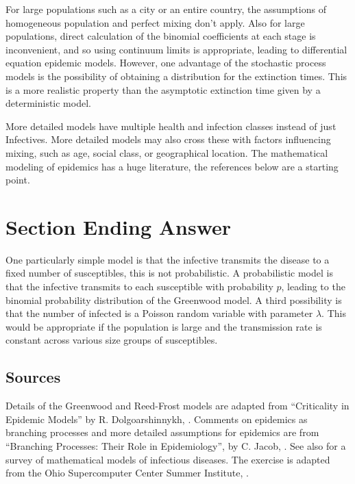 \documentclass[12pt]{article}
\begin{document}
For large populations such as a city or an entire country, the
assumptions of homogeneous population and perfect mixing don't apply.
Also for large populations, direct calculation of the binomial
coefficients at each stage is inconvenient, and so using continuum
limits is appropriate, leading to differential equation epidemic models.
However, one advantage of the stochastic process models is the
possibility of obtaining a distribution for the extinction times. This
is a more realistic property than the asymptotic extinction time given
by a deterministic model.

More detailed models have multiple health and infection classes instead
of just Infectives.  More detailed models may also cross these with
factors influencing mixing, such as age, social class, or geographical
location.  The mathematical modeling of epidemics has a huge literature,
the references below are a starting point.

\section*{Section Ending Answer}

One particularly simple model is that the infective transmits the
disease to a fixed number of susceptibles, this is not
probabilistic.  A probabilistic model is that the infective transmits
to each susceptible with probability \( p \), leading to the binomial
probability distribution of the Greenwood model.  A third possibility
is that the number of infected is a Poisson random
variable with parameter \( \lambda \).  This would be appropriate if
the population is large and the transmission rate is constant across
various size groups of susceptibles.

\subsection*{Sources}

Details of the Greenwood and Reed-Frost models are adapted from
``Criticality in Epidemic Models'' by R. Dolgoarshinnykh,
\cite{dolgoarshinnykh}. Comments on epidemics as branching processes and
more detailed assumptions for epidemics are from ``Branching Processes:
Their Role in Epidemiology'', by C. Jacob,
\cite{jacob10}.  See also
\cite{siettos2013} for a survey of mathematical models of infectious
diseases.  The exercise is adapted from the Ohio Supercomputer Center
Summer Institute,
.
\end{document}
